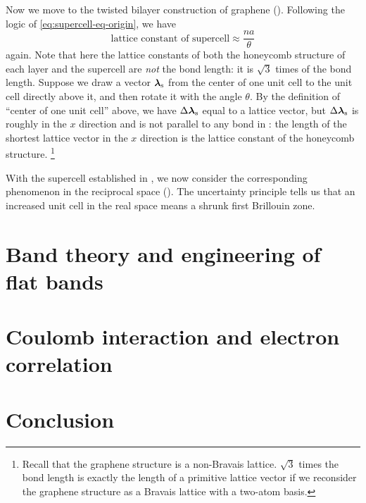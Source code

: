 \documentclass[hyperref, a4paper]{article}
\begin{document}
Now we move to the twisted bilayer construction of graphene ().
Following the logic of \eqref{eq:supercell-eq-origin},
we have 
\begin{equation}
    \text{lattice constant of supercell} \approx \frac{na}{\theta}
\end{equation}
again. Note that here the lattice constants of both the honeycomb structure of each layer and the supercell 
are \emph{not} the bond length:
it is $\sqrt{3}$ times of the bond length.
Suppose we draw a vector $\vb*{\lambda}_{\text{s}}$ 
from the center of one unit cell to the unit cell directly above it,
and then rotate it with the angle $\theta$.
By the definition of ``center of one unit cell'' above,
we have $\Delta \vb*{\lambda}_{\text{s}}$ equal to a lattice vector,
but $\Delta \vb*{\lambda}_{\text{s}}$ is roughly in the $x$ direction 
and is not parallel to any bond in :
the length of the shortest lattice vector in the $x$ direction is 
the lattice constant of the honeycomb structure.%
\footnote{
    Recall that the graphene structure is a non-Bravais lattice.
    $\sqrt{3}$ times the bond length is exactly the length of a primitive lattice vector 
    if we reconsider the graphene structure as a Bravais lattice 
    with a two-atom basis.
}

With the supercell established in ,
we now consider the corresponding phenomenon in the reciprocal space
().
The uncertainty principle tells us that an increased unit cell in the real space 
means a shrunk first Brillouin zone.


\section{Band theory and engineering of flat bands}

\section{Coulomb interaction and electron correlation}

\section{Conclusion}



\end{document}
